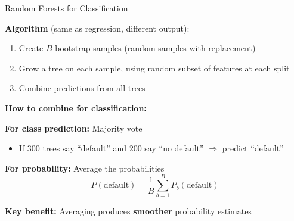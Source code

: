 \documentclass[10pt]{beamer}
\newcommand{\highlight}[1]{\textcolor{AccentOrange}{\textbf{#1}}}
\begin{document}

\begin{frame}{Random Forests for Classification}

  \textbf{Algorithm} (same as regression, different output):
  \begin{enumerate}
    \item Create $B$ bootstrap samples (random samples with replacement)
    \item Grow a tree on each sample, using random subset of features at each split
    \item Combine predictions from all trees
  \end{enumerate}

  \vspace{1em}
  \textbf{How to combine for classification:}

  \vspace{0.3em}
  \textbf{For class prediction:} Majority vote
  \begin{itemize}
    \item If 300 trees say ``default'' and 200 say ``no default'' $\Rightarrow$ predict ``default''
  \end{itemize}

  \vspace{0.3em}
  \textbf{For probability:} Average the probabilities
  \[
  P(\text{default}) = \frac{1}{B}\sum_{b=1}^{B} P_b(\text{default})
  \]

  \vspace{0.5em}
  \textbf{Key benefit:} Averaging produces \highlight{smoother} probability estimates
\end{frame}

\end{document}
